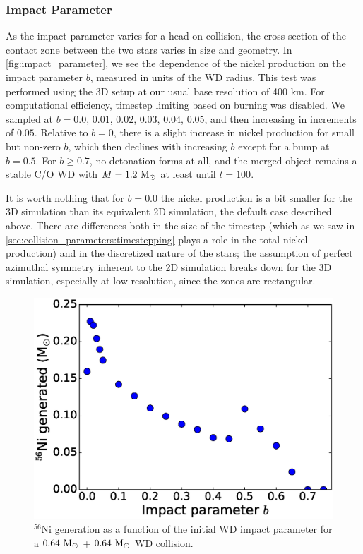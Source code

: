 \documentclass[12pt]{article}
\begin{document}
\subsubsection{Impact Parameter}
\label{sec:collision_parameters:impactparameter}

As the impact parameter varies for a head-on collision, the cross-section of the contact
zone between the two stars varies in size and geometry. In \autoref{fig:impact_parameter}, we
see the dependence of the nickel production on the impact parameter $b$, measured in units
of the WD radius. This test was performed using the 3D setup at our usual base resolution of
400 km. For computational efficiency, timestep limiting based on burning was disabled.
We sampled at $b = 0.0$, $0.01$, $0.02$, $0.03$, $0.04$, $0.05$, and then increasing
in increments of $0.05$. Relative to $b = 0$, there is a slight increase in nickel production for small
but non-zero $b$, which then declines with increasing $b$ except for a bump at $b = 0.5$.
For $b \ge 0.7$, no detonation forms at all, and the merged object remains a stable C/O WD
with $M = 1.2\ \mathrm{M}_\odot$ at least until $t = 100$.

It is worth nothing that for $b = 0.0$ the nickel production is a bit smaller for the 3D simulation
than its equivalent 2D simulation, the default case described above. There are differences both in
the size of the timestep (which as we saw in \autoref{sec:collision_parameters:timestepping} plays a role in
the total nickel production) and in the discretized nature of the stars; the assumption of perfect
azimuthal symmetry inherent to the 2D simulation breaks down for the 3D simulation, especially at
low resolution, since the zones are rectangular.

\begin{figure}
  \centering
  \includegraphics[scale=0.8]{plots/impact_parameter}
  \caption[Nickel production dependence on the impact parameter]
          {$^{56}$Ni generation as a function of the initial WD impact parameter for
           a $0.64\ \mathrm{M}_\odot$ + $0.64\ \mathrm{M}_\odot$ WD collision.
           \label{fig:impact_parameter}}
\end{figure}
\end{document}
